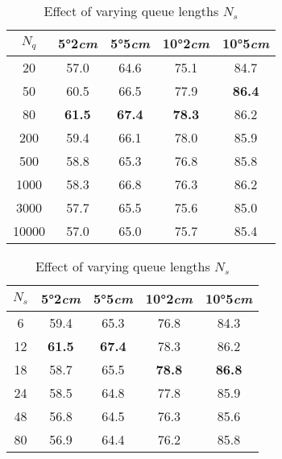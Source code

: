 \begin{table}[htbp]
    \small
    \centering
    \begin{subtable}[t]{1.0\linewidth}  %
        \centering
        \setlength\tabcolsep{8pt}%
        \begin{tabular}{c|cccc}
            \toprule
            $N_{q}$ & 5°2\emph{cm} & 5°5\emph{cm} & 10°2\emph{cm}  & 10°5\emph{cm}\\
            \midrule
            20  & 57.0          & 64.6    &75.1  &84.7   \\
            50 & 60.5          &66.5    &77.9 &\textbf{86.4}   \\
            \rowcolor{mygray}
            80 & \textbf{61.5}          &\textbf{67.4}    &\textbf{78.3} &86.2   \\
            200  &59.4          &66.1    &78.0 &85.9   \\
            500  &  58.8         &65.3    &76.8 &85.8   \\
            1000  & 58.3          &66.8    &76.3 &86.2   \\
            3000  & 57.7          &65.5    &75.6 &85.0   \\
            10000  & 57.0          &65.0    &75.7 &85.4   \\
            \bottomrule
        \end{tabular}
        \caption{Effect of varying queue lengths $N_{q}$}
        \label{tab:supp_ab_causal_Nq}
    \end{subtable}
    
    \vspace{0.2cm}  %

    \begin{subtable}[t]{1.0\linewidth}  %
        \centering
        \setlength\tabcolsep{9pt}%
        \begin{tabular}{c|cccc}
            \toprule
            $N_{s}$ & 5°2\emph{cm} & 5°5\emph{cm} & 10°2\emph{cm}  & 10°5\emph{cm}\\
            \midrule
            6  & 59.4          & 65.3    &76.8  &84.3   \\
            \rowcolor{mygray}
            12 & \textbf{61.5}          &\textbf{67.4}    &78.3 &86.2   \\
            18 & 58.7          &65.5    &\textbf{78.8} &\textbf{86.8}   \\
            24  &  58.5         &64.8    &77.8 &85.9   \\
            48  &56.8          &64.5    &76.3 &85.6   \\
            80  & 56.9          &64.4    &76.2 &85.8   \\
            \bottomrule
        \end{tabular}
        \caption{Effect of varying queue lengths $N_{s}$}
        \label{tab:supp_ab_causal_Ns}
    \end{subtable}


\end{table}
